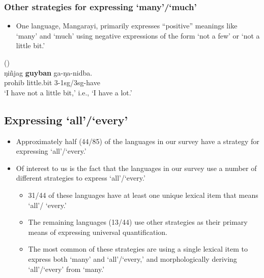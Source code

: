 \documentclass{article}
\makeatletter
\newcommand{\ofy}{/85} %
\makeatother
\begin{document}
\subsubsection{Other strategies for expressing `many'/`much'}

\begin{itemize}
    \item One language, Mangarayi, primarily expresses ``positive'' meanings like `many' and `much' using negative expressions of the form `not a few' or `not a little bit.'
\end{itemize}

\begin{exe}
 (\citealt[37-38]{merlan89}) \\
\gll ŋi\~{n}jag \textbf{guyban} ga-ŋa-nidba.\\
{\sc prohib} little.bit 3-1{\sc sg}/3{\sc sg}-have\\
\glt `I have not a little bit,' i.e., `I have a lot.'
\end{exe}


\subsection{Expressing `all'/`every'}

\begin{itemize}
    \item Approximately half (44\ofy) of the languages in our survey have a strategy for expressing `all'/`every.'
    \item Of interest to us is the fact that the languages in our survey use a number of different strategies to express `all'/`every.'
\begin{itemize}
\item 31/44 of these languages have at least one unique lexical item that means `all'/ `every.'
    \item The remaining languages (13/44) use other strategies as their primary means of expressing universal quantification.
    
    \item The most common of these strategies are using a single lexical item to express both `many' and `all'/`every,' and morphologically deriving `all'/`every' from `many.'
\end{itemize}
\end{itemize}
\end{document}
